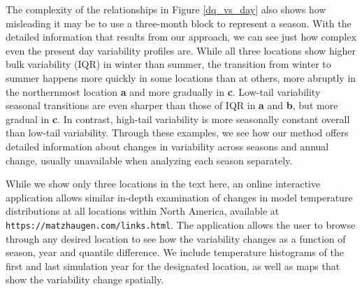 \documentclass{ametsoc}
\begin{document}
The complexity of the relationships in Figure \ref{dq_vs_day} also shows how misleading it may be to use a three-month block to represent a season. 
 With the detailed information that results from our approach, we can see just how complex even the present day variability profiles are. While all three locations show higher bulk variability (IQR) in winter than summer, the transition from winter to summer happens more quickly in some locations than at others, more abruptly in the northernmost location \textbf{a} and more gradually in \textbf{c}. Low-tail variability seasonal transitions are even sharper than those of IQR in \textbf{a} and \textbf{b}, but more gradual in \textbf{c}.
In contrast, high-tail variability is more seasonally constant overall than low-tail variability. 
Through these examples, we see how our method offers detailed information about changes in variability across seasons and annual change, usually unavailable when analyzing each season separately. 

While we show only three locations in the text here, an online interactive application allows similar in-depth examination of changes in model temperature distributions at all locations within North America, available at {\small\texttt{https://matzhaugen.com/links.html}}. The application allows the user to browse through any desired location to see how the variability changes as a function of season, year and quantile difference. We include temperature histograms of the first and last simulation year for the designated location, as well as maps that show the variability change spatially. 
\end{document}
